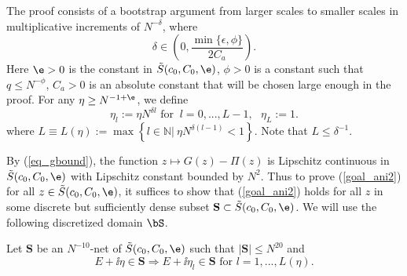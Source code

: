 
The proof consists of a bootstrap argument from larger scales to smaller scales in multiplicative increments of $N^{-\delta}$, where
\begin{equation}
 \delta \in\left(0,\frac{\min\{\epsilon,\phi\}}{2C_a}\right). \label{assm_comp_delta}
\end{equation}
Here $\e>0$ is the constant in $\tilde S(c_0,C_0,\e)$, $\phi>0$ is a constant such that $q\le N^{-\phi}$, $C_a> 0$ is an absolute constant that will be chosen large enough in the proof. For any $\eta\ge N^{-1+\e}$, we define
\begin{equation}\label{eq_comp_eta}
\eta_l:=\eta N^{\delta l} \text{ for } \ l=0,...,L-1,\ \ \ \eta_L:=1.
\end{equation}
where
$L\equiv L(\eta):=\max\left\{l\in\mathbb N|\ \eta N^{\delta(l-1)}<1\right\}.$
Note that $L\le \delta^{-1}$.

By (\ref{eq_gbound}), the function $z\mapsto G(z)- \Pi(z)$ is Lipschitz continuous in $\tilde S(c_0,C_0,\e)$ with Lipschitz constant bounded by $N^2$. Thus to prove (\ref{goal_ani2}) for all $z\in \tilde S(c_0,C_0,\e)$, it suffices to show that (\ref{goal_ani2}) holds for all $z$ in some discrete but sufficiently dense subset ${\mathbf S} \subset \tilde S(c_0,C_0,\e)$. We will use the following discretized domain $\bS$.
\begin{definition}
Let $\mathbf S$ be an $N^{-10}$-net of $\tilde S(c_0,C_0,\e)$ such that $ |\mathbf S |\le N^{20}$ and
\[E+\ii\eta\in\mathbf S\Rightarrow E+\ii\eta_l\in\mathbf S\text{ for }l=1,...,L(\eta).\]
\end{definition}

